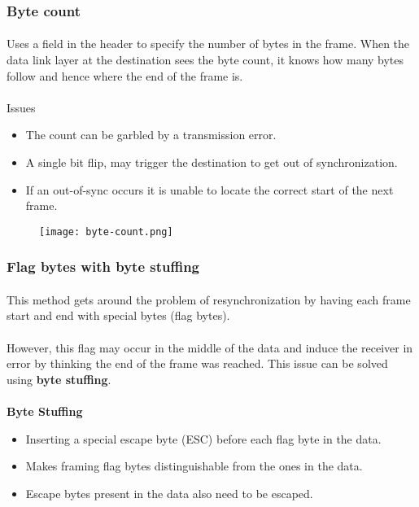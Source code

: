 \documentclass[../resumosRCOM.tex]{subfiles}
\begin{document}
\subsubsection{Byte count}
\paragraph{}
Uses a field in the header to specify the number of bytes in the 
frame. When the data link layer at the destination sees the byte count,
it knows how many bytes follow and hence where the end of the frame is.

\paragraph{}
Issues
\begin{itemize}
    \item The count can be garbled by a transmission error.     
    \item A single bit flip, may trigger the destination to get
    out of synchronization. 
    \item If an out-of-sync occurs it is unable to locate the correct
    start of the next frame.
\end{itemize}

\begin{figure}[h]
    \centering
    \texttt{[image: byte-count.png]}
\end{figure}

\subsubsection{Flag bytes with byte stuffing}
\paragraph{}
This method gets around the problem of resynchronization by having each frame
start and end with special bytes (flag bytes).

\paragraph{}
However, this flag may occur in the middle of the data and induce the receiver
in error by thinking the end of the frame was reached. This issue can be solved
using \textbf{byte stuffing}.

\paragraph{}
\textbf{Byte Stuffing}
\begin{itemize}
    \item Inserting a special escape byte (ESC) before each flag byte in 
    the data.
    \item Makes framing flag bytes distinguishable from the ones in the data.
    \item Escape bytes present in the data also need to be escaped.
\end{itemize}
 
\end{document}
